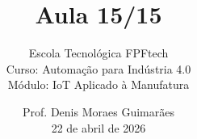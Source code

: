 
\title{Aula 15/15}

\subtitle{
\texorpdfstring{
\vspace{1.0cm}
Escola Tecnológica FPFtech\\
\vspace{0.5cm}
Curso: Automação para Indústria 4.0\\
\vspace{0.5cm}
Módulo: IoT Aplicado à Manufatura
\vspace{1.0cm}
}{
Escola Tecnológica FPFtech - Curso: Automação para Indústria 4.0 - Módulo: IoT Aplicado à Manufatura
}
}

\author{
Prof. Denis Moraes Guimarães\\
\small 22 de abril de 2026
}

\date{}